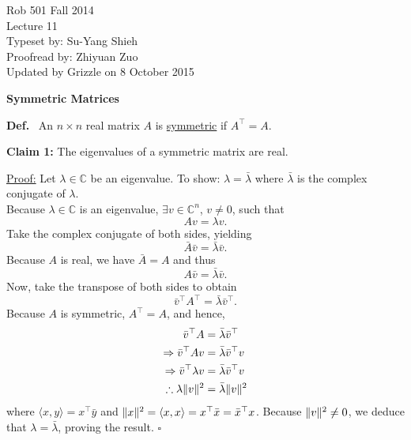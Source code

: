\documentclass[letterpaper]{article}
\newcommand{\cp}{\mathbb C}    %
\begin{document}
\baselineskip=48pt  %


\setlength{\parskip}{.3in}
\setlength{\itemsep}{.3in}

\pagestyle{plain}

{\Large \bf
\begin{center}
Rob 501 Fall 2014\\
Lecture 11\\
Typeset by:  Su-Yang Shieh\\
Proofread by: Zhiyuan Zuo\\
Updated by Grizzle on 8 October 2015
\end{center}
}

\Large



\begin{center}\textbf{Symmetric Matrices}\end{center}

\textbf{Def.}~ An $n\times n$ real matrix $A$ is \underline{symmetric} if $A^\top=A$.

\textbf{Claim 1:} The eigenvalues of a symmetric matrix are real.

\underline{Proof:} Let $\lambda\in \cp$ be an eigenvalue. To show: $\lambda=\bar{\lambda}$ where $\bar{\lambda}$ is the complex conjugate of $\lambda$.\\
    Because $\lambda\in \cp$ is an eigenvalue, $\exists v \in \cp^n$, $v\neq0$, such that
    $$Av=\lambda v.$$
    Take the complex conjugate of both sides, yielding $$\bar{A}\bar{v}=\bar{\lambda} \bar{v}.$$
    Because $A$ is real, we have $\bar{A} = A$ and thus $$A\bar{v}=\bar{\lambda} \bar{v}.$$
    Now, take the transpose of both sides to obtain
    $$\bar{v}^\top A^\top =\bar{\lambda} \bar{v}^\top.$$
    Because $A$ is symmetric,  $A^\top =A$, and hence,
    \begin{align*}
        \bar{v}^\top A&=\bar{\lambda} \bar{v}^\top \\
        \Rightarrow\bar{v}^\top Av&=\bar{\lambda} \bar{v}^\top v\\
        \Rightarrow\bar{v}^\top \lambda v&=\bar{\lambda} \bar{v}^\top v\\
        \therefore \lambda\Arrowvert v\Arrowvert^2&=\bar{\lambda}\Arrowvert v\Arrowvert^2\\
    \end{align*}
    where $\langle x,y \rangle=x^\top \bar{y}$ and $ \Arrowvert x  \Arrowvert ^2=\langle x,x \rangle =x^\top \bar{x}=\bar{x}^\top  {x}$. Because $\Arrowvert v\Arrowvert^2 \neq 0$, we deduce that $\lambda =\bar{\lambda}$, proving the result. $\square$
\end{document}
